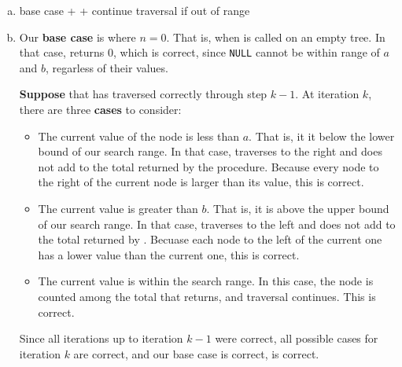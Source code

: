 \documentclass[11pt]{article}
\begin{document}
\begin{enumerate}[(a)]
    \item \begin{algorithmic}[1]
            \Comment base case
                \State {}
            \EndIf
                \State {} +  + 
            \Comment continue traversal if out of range
                \State \Return {}
            \Else
                \State \Return {}
            \EndIf
        \EndProcedure
	\end{algorithmic}

    \item Our \textbf{base case} is where $n=0$. That is, when  
        is called on an empty tree. In that case,  returns 0, 
        which is correct, since \texttt{NULL} cannot be within range of 
        $a$ and $b$, regarless of their values.

        \textbf{Suppose} that  has traversed correctly through
        step $k-1$. At iteration $k$, there are three \textbf{cases} to 
        consider:
        \begin{itemize}
            \item The current value of the node is less than $a$. That is, it
                it below the lower bound of our search range. In that case,
                 traverses to the right and does not add to the
                total returned by the  procedure. Because every
                node to the right of the current node is larger than its
                value, this is correct.
            \item The current value is greater than $b$. That is, it is above the
                upper bound of our search range. In that case, 
                traverses to the left and does not add to the total returned
                by . Becuase each node to the left of the current
                one has a lower value than the current one, this is correct.
            \item The current value is within the search range. In this case,
                the node is counted among the total that 
                returns, and traversal continues. This is correct.
        \end{itemize}
        Since all iterations up to iteration $k-1$ were correct, all
        possible cases for iteration $k$ are correct, and our base case is
        correct,  is correct.


\end{enumerate}
\end{document}
